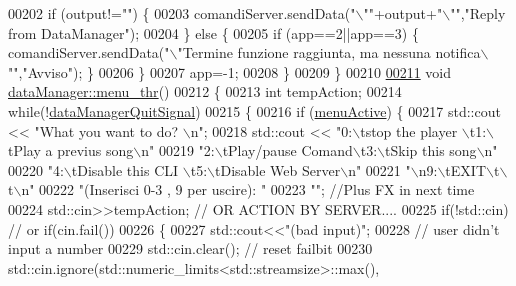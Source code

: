 \begin{DoxyCode}
00202         \textcolor{keywordflow}{if} (output!=\textcolor{stringliteral}{""}) \{
00203             comandiServer.sendData(\textcolor{stringliteral}{"\(\backslash\)""}+output+\textcolor{stringliteral}{"\(\backslash\)""},\textcolor{stringliteral}{"Reply from DataManager"});
00204         \} \textcolor{keywordflow}{else} \{
00205             \textcolor{keywordflow}{if} (app==2||app==3) \{ comandiServer.sendData(\textcolor{stringliteral}{"\(\backslash\)"Termine funzione
       raggiunta, ma nessuna notifica\(\backslash\)""},\textcolor{stringliteral}{"Avviso"}); \}
00206         \}
00207         app=-1;
00208     \}
00209 \}
00210 
\hypertarget{dataManagerHub_8cpp_source_l00211}{}\hyperlink{classdataManager_a7ba580547b0d0dbe516b8e694e9f51b2}{00211} \textcolor{keywordtype}{void} \hyperlink{classdataManager_a7ba580547b0d0dbe516b8e694e9f51b2}{dataManager::menu_thr}()
00212 \{
00213     \textcolor{keywordtype}{int} tempAction;
00214     \textcolor{keywordflow}{while}(!\hyperlink{classdataManager_a76b9dba2dde86540f5f37f3b5840653e}{dataManagerQuitSignal})
00215     \{
00216         \textcolor{keywordflow}{if} (\hyperlink{classdataManager_a7126a92f131b786ecf68b7a27d58d814}{menuActive}) \{
00217             std::cout << \textcolor{stringliteral}{"What you want to do? \(\backslash\)n"};
00218             std::cout << \textcolor{stringliteral}{"0:\(\backslash\)tstop the player \(\backslash\)t1:\(\backslash\)tPlay a previus song\(\backslash\)n"}
00219                      \textcolor{stringliteral}{"2:\(\backslash\)tPlay/pause Comand\(\backslash\)t3:\(\backslash\)tSkip this song\(\backslash\)n"}
00220                      \textcolor{stringliteral}{"4:\(\backslash\)tDisable this CLI \(\backslash\)t5:\(\backslash\)tDisable Web Server\(\backslash\)n"}
00221                      \textcolor{stringliteral}{"\(\backslash\)n9:\(\backslash\)tEXIT\(\backslash\)t\(\backslash\)t\(\backslash\)n"}
00222                      \textcolor{stringliteral}{"(Inserisci 0-3 , 9 per uscire): "}
00223                      \textcolor{stringliteral}{""}; \textcolor{comment}{//Plus FX in next time}
00224             std::cin>>tempAction; \textcolor{comment}{// OR ACTION BY SERVER....}
00225             \textcolor{keywordflow}{if}(!std::cin) \textcolor{comment}{// or if(cin.fail())}
00226             \{
00227                 std::cout<<\textcolor{stringliteral}{"(bad input)"};
00228                 \textcolor{comment}{// user didn't input a number}
00229                 std::cin.clear(); \textcolor{comment}{// reset failbit}
00230                 std::cin.ignore(std::numeric\_limits<std::streamsize>::max(), \textcolor{charliteral}{
}
\end{DoxyCode}
